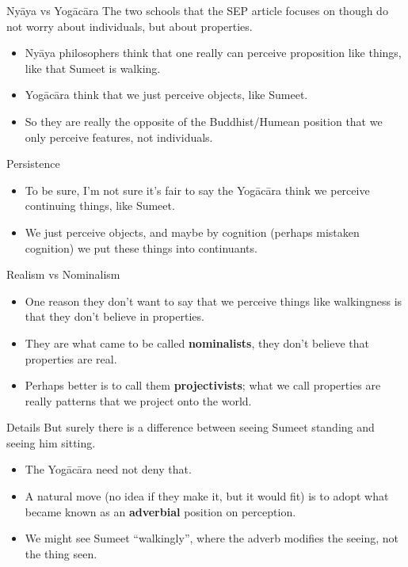\documentclass[
  17pt,
  letterpaper,
  ignorenonframetext,
  aspectratio=169,
]{beamer}
\providecommand{\tightlist}{%
  \setlength{\itemsep}{0pt}\setlength{\parskip}{0pt}}\usepackage{longtable,booktabs,array}
\begin{document}
\begin{frame}{Nyāya vs Yogācāra}
\protect\hypertarget{nyux101ya-vs-yogux101cux101ra}{}
The two schools that the SEP article focuses on though do not worry
about individuals, but about properties.

\begin{itemize}[<+->]
\tightlist
\item
  Nyāya philosophers think that one really can perceive proposition like
  things, like that Sumeet is walking.
\item
  Yogācāra think that we just perceive objects, like Sumeet.
\item
  So they are really the opposite of the Buddhist/Humean position that
  we only perceive features, not individuals.
\end{itemize}
\end{frame}

\begin{frame}{Persistence}
\protect\hypertarget{persistence}{}
\begin{itemize}[<+->]
\tightlist
\item
  To be sure, I'm not sure it's fair to say the Yogācāra think we
  perceive continuing things, like Sumeet.
\item
  We just perceive objects, and maybe by cognition (perhaps mistaken
  cognition) we put these things into continuants.
\end{itemize}
\end{frame}

\begin{frame}{Realism vs Nominalism}
\protect\hypertarget{realism-vs-nominalism}{}
\begin{itemize}[<+->]
\tightlist
\item
  One reason they don't want to say that we perceive things like
  walkingness is that they don't believe in properties.
\item
  They are what came to be called \textbf{nominalists}, they don't
  believe that properties are real.
\item
  Perhaps better is to call them \textbf{projectivists}; what we call
  properties are really patterns that we project onto the world.
\end{itemize}
\end{frame}

\begin{frame}{Details}
\protect\hypertarget{details}{}
But surely there is a difference between seeing Sumeet standing and
seeing him sitting.

\begin{itemize}[<+->]
\tightlist
\item
  The Yogācāra need not deny that.
\item
  A natural move (no idea if they make it, but it would fit) is to adopt
  what became known as an \textbf{adverbial} position on perception.
\item
  We might see Sumeet ``walkingly'', where the adverb modifies the
  seeing, not the thing seen.
\end{itemize}
\end{frame}
\end{document}
